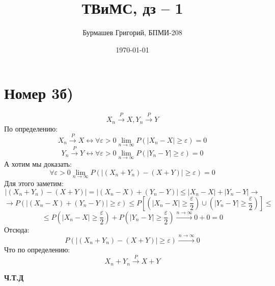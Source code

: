 \documentclass[a4paper,12pt]{article}
\author{Бурмашев Григорий, БПМИ-208}
\title{ТВиМС, дз -- 1}
\date{\today}
\begin{document}
\maketitle 
\section*{Номер 3б)}
\[
X_n \overset{P}{ \longrightarrow } X , Y_n \overset{P}{ \longrightarrow } Y
\]
По определению:
\[
X_n \overset{P}{ \longrightarrow } X \longleftrightarrow \forall \varepsilon > 0  \lim_{n \rightarrow \infty} P \left( |X_n - X| \geq \varepsilon \right) = 0
\]
\[
Y_n \overset{P}{ \longrightarrow } Y \longleftrightarrow \forall \varepsilon > 0  \lim_{n \rightarrow \infty} P \left( |Y_n - Y| \geq \varepsilon \right) = 0
\]
А хотим мы доказать:
\[
\forall \varepsilon > 0  \lim_{n \rightarrow \infty} P \left( |(X_n + Y_n)- (X + Y) | \geq \varepsilon \right) = 0
\]
Для этого заметим:
\[
|(X_n + Y_n) - (X + Y)| = |(X_n - X) + (Y_n - Y)| \leq |X_n - X| + |Y_n - Y|  
\rightarrow
\]
\[
\rightarrow 
P(|(X_n -X) + (Y_n - Y) | \geq \varepsilon) \leq P\left[ \left(|X_n-X| \geq \frac{\varepsilon}{2} \right) \cup \left(|Y_n - Y| \geq \frac{\varepsilon}{2} \right) \right] 
\leq 
\]
\[
\leq P \left( |X_n - X| \geq \frac{\varepsilon}{2} \right) + P \left( |Y_n - Y| \geq \frac{\varepsilon}{2} \right) \overset{n \rightarrow \infty }{\longrightarrow} 0 + 0 = 0
\]
Отсюда:   
\[
P(|(X_n + Y_n) - (X + Y) | \geq \varepsilon) \overset{n \rightarrow \infty }{\longrightarrow} 0
\]
Что по определению:
\[
X_n + Y_n \overset{P}{ \longrightarrow } X + Y 
\]
\begin{center}
\textbf{Ч.Т.Д} 
\end{center}
\clearpage
\end{document}

